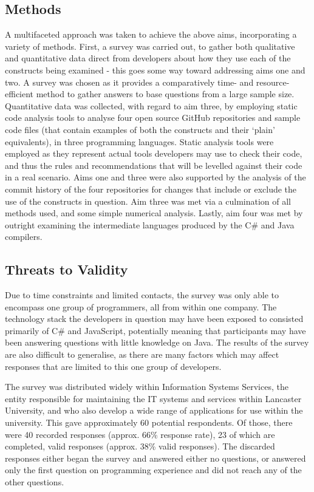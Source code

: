 \documentclass{article}
\begin{document}
    \subsection{Methods}
        A multifaceted approach was taken to achieve the above aims, incorporating a variety of methods. First, a survey was carried out, to gather both qualitative and quantitative data direct from developers about how they use each of the constructs being examined - this goes some way toward addressing aims one and two. A survey was chosen as it provides a comparatively time- and resource-efficient method to gather answers to base questions from a large sample size.
        Quantitative data was collected, with regard to aim three, by employing static code analysis tools to analyse four open source GitHub repositories and sample code files (that contain examples of both the constructs and their `plain' equivalents), in three programming languages. Static analysis tools were employed as they represent actual tools developers may use to check their code, and thus the rules and recommendations that will be levelled against their code in a real scenario.
        Aims one and three were also supported by the analysis of the commit history of the four repositories for changes that include or exclude the use of the constructs in question. Aim three was met via a culmination of all methods used, and some simple numerical analysis.
        Lastly, aim four was met by outright examining the intermediate languages produced by the C\# and Java compilers.

    \subsection{Threats to Validity}
        Due to time constraints and limited contacts, the survey was only able to encompass one group of programmers, all from within one company. The technology stack the developers in question may have been exposed to consisted primarily of C\# and JavaScript, potentially meaning that participants may have been answering questions with little knowledge on Java. The results of the survey are also difficult to generalise, as there are many factors which may affect responses that are limited to this one group of developers.

        The survey was distributed widely within Information Systems Services, the entity responsible for maintaining the IT systems and services within Lancaster University, and who also develop a wide range of applications for use within the university.  This gave approximately 60 potential respondents. Of those, there were 40 recorded responses  (approx. 66\% response rate), 23 of which are completed, valid responses (approx. 38\% valid responses). The discarded responses either began the survey and answered either no questions, or answered only the first question on programming experience and did not reach any of the other questions.
        
\end{document}
